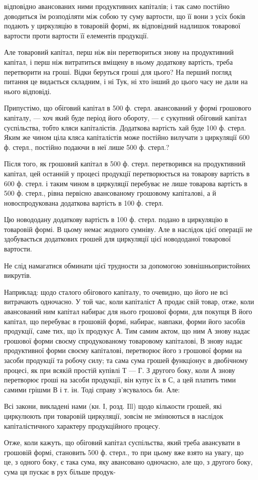 відповідно авансованих ними продуктивних капіталів; і так само постійно
доводиться їм розподіляти між собою ту суму вартости, що її вони
з усіх боків подають у циркуляцію в товаровій формі, як відповідний
надлишок товарової вартости проти вартости її елементів продукції.

Але товаровий капітал, перш ніж він перетвориться знову на продуктивний
капітал, і перш ніж витратиться вміщену в ньому додаткову
вартість, треба перетворити на гроші. Відки беруться гроші для цього?
На перший погляд питання це видається складним, і ні Тук, ні хто інший
до цього часу не дали на нього відповіді.

Припустімо, що обіговий капітал в 500 ф. стерл. авансований у формі
грошового капіталу, — хоч який буде період його обороту, — є сукупний
обіговий капітал суспільства, тобто кляси капіталістів. Додаткова вартість
хай буде 100 ф. стерл. Яким же чином ціла кляса капіталістів може постійно
вилучати з циркуляції 600 ф. стерл., постійно подаючи в неї
лише 500 ф. стерл.?

Після того, як грошовий капітал в 500 ф. стерл. перетворився на
продуктивний капітал, цей останній у процесі продукції перетворюється
на товарову вартість в 600 ф. стерл. і таким чином в циркуляції перебуває
не лише товарова вартість в 500 ф. стерл., рівна первісно авансованому
грошовому капіталові, а й новоспродукована додаткова
вартість в 100 ф. стерл.

Цю новододану додаткову вартість в 100 ф. стерл. подано в циркуляцію
в товаровій формі. В цьому немає жодного сумніву. Але в наслідок
цієї операції не здобувається додаткових грошей для циркуляції
цієї новододаної товарової вартости.

Не слід намагатися обминати цієї трудности за допомогою зовнішньопристойних
викрутів.

Наприклад: щодо сталого обігового капіталу, то очевидно, що його
не всі витрачають одночасно. У той час, коли капіталіст А продає
свій товар, отже, коли авансований ним капітал набирає для нього грошової
форми, для покупця В його капітал, що перебуває в грошовій
формі, набирає, навпаки, форми його засобів продукції, саме тих, що їх
продукує А. Тим самим актом, що ним А знову надає грошової форми
своєму спродукованому товаровому капіталові, В знову надає продуктивної
форми своєму капіталові, перетворює його з грошової форми на засоби
продукції та робочу силу; та сама сума грошей функціонує в двобічному
процесі, як при всякій простій купівлі Т — Г. З другого боку, коли
А знову перетворює гроші на засоби продукції, він купує їх в С, а
цей платить тими самими грішми В і т. ін. Тоді справу з’ясувалось би. Але:

Всі закони, викладені нами (кн. І, розд. Ill) щодо кількости грошей,
які циркулюють при товаровій циркуляції, зовсім не змінюються в наслідок
капіталістичного характеру продукційного процесу.

Отже, коли кажуть, що обіговий капітал суспільства, який треба
авансувати в грошовій формі, становить 500 ф. стерл., то при цьому вже
взято на увагу, що це, з одного боку, є така сума, яку авансовано одночасно,
але що, з другого боку, сума ця пускає в рух більше продук-
